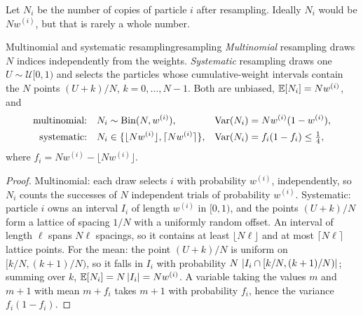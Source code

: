 Let $N_i$ be the number of copies of particle $i$ after resampling.
Ideally $N_i$ would be $Nw^{(i)}$, but that is rarely a whole number.

\begin{proposition}{Multinomial and systematic resampling}{resampling}
\emph{Multinomial} resampling draws $N$ indices independently from the
weights.
\emph{Systematic} resampling draws one $U\sim\mathcal U[0,1)$ and selects
the particles whose cumulative-weight intervals contain the $N$ points
$(U+k)/N$, $k=0,\dots,N-1$. Both are unbiased, $\mathbb{E}[N_i]=Nw^{(i)}$, and
\begin{align*}
  \text{multinomial:}&\quad N_i\sim\operatorname{Bin}(N,w^{(i)}),
  &\operatorname{Var}(N_i)&=Nw^{(i)}(1-w^{(i)}),\\
  \text{systematic:}&\quad N_i\in\{\lfloor Nw^{(i)}\rfloor,
  \lceil Nw^{(i)}\rceil\},&\operatorname{Var}(N_i)&=f_i(1-f_i)\le\tfrac14,
\end{align*}
where $f_i=Nw^{(i)}-\lfloor Nw^{(i)}\rfloor$.
\end{proposition}

\begin{proof}
Multinomial: each draw selects $i$ with probability $w^{(i)}$,
independently, so $N_i$ counts the successes of $N$ independent trials of
probability $w^{(i)}$. Systematic: particle $i$ owns an interval $I_i$ of
length $w^{(i)}$ in $[0,1)$, and the points $(U+k)/N$ form a lattice of
spacing $1/N$ with a uniformly random offset. An interval of length
$\ell$ spans $N\ell$ spacings, so it contains at least $\lfloor
N\ell\rfloor$ and at most $\lceil N\ell\rceil$ lattice points. For the
mean: the point $(U+k)/N$ is uniform on $[k/N,(k+1)/N)$, so it falls in
$I_i$ with probability $N\,\left\lvert I_i\cap[k/N,(k+1)/N)\right\rvert$; summing over $k$,
$\mathbb{E}[N_i]=N\left\lvert I_i\right\rvert=Nw^{(i)}$. A variable
taking the values $m$ and $m+1$ with mean $m+f_i$ takes $m+1$ with
probability $f_i$, hence the variance $f_i(1-f_i)$.
\end{proof}

